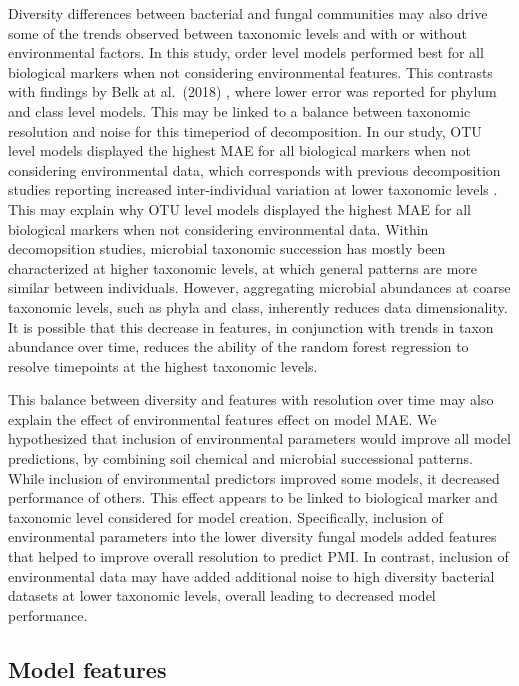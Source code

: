 \documentclass[
  10pt,
  letterpaper,
]{article}
\begin{document}
Diversity differences between bacterial and fungal communities may also
drive some of the trends observed between taxonomic levels and with or
without environmental factors. In this study, order level models
performed best for all biological markers when not considering
environmental features. This contrasts with findings by Belk at
al.~(2018) \citep{belk_microbiome_2018}, where lower error was reported
for phylum and class level models. This may be linked to a balance
between taxonomic resolution and noise for this timeperiod of
decomposition. In our study, OTU level models displayed the highest MAE
for all biological markers when not considering environmental data,
which corresponds with previous decomposition studies reporting
increased inter-individual variation at lower taxonomic levels
\citep{metcalf_microbial_2016, mason_body_2022, taylor_soil_2024}. This
may explain why OTU level models displayed the highest MAE for all
biological markers when not considering environmental data. Within
decomopsition studies, microbial taxonomic succession has mostly been
characterized at higher taxonomic levels, at which general patterns are
more similar between individuals. However, aggregating microbial
abundances at coarse taxonomic levels, such as phyla and class,
inherently reduces data dimensionality. It is possible that this
decrease in features, in conjunction with trends in taxon abundance over
time, reduces the ability of the random forest regression to resolve
timepoints at the highest taxonomic levels.

This balance between diversity and features with resolution over time
may also explain the effect of environmental features effect on model
MAE. We hypothesized that inclusion of environmental parameters would
improve all model predictions, by combining soil chemical and microbial
successional patterns. While inclusion of environmental predictors
improved some models, it decreased performance of others. This effect
appears to be linked to biological marker and taxonomic level considered
for model creation. Specifically, inclusion of environmental parameters
into the lower diversity fungal models added features that helped to
improve overall resolution to predict PMI. In contrast, inclusion of
environmental data may have added additional noise to high diversity
bacterial datasets at lower taxonomic levels, overall leading to
decreased model performance.

\hypertarget{model-features}{%
\subsection{Model features}\label{model-features}}
\end{document}
